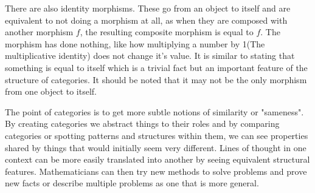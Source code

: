 \documentclass[10pt,a4paper]{amsart}
\begin{document}
\begin{flushleft}
There are also identity morphisms.
These go from an object to itself and are equivalent to not doing a morphism at all,
as when they are composed with another morphism $f$, the resulting composite morphism is equal to $f$.
The morphism has done nothing, like how multiplying a number by 1(The multiplicative identity) does not change it's value.
It is similar to stating that something is equal to itself which is a trivial fact but an important feature of the structure of categories.
It should be noted that it may not be the only morphism from one object to itself.

The point of categories is to get more subtle notions of similarity or "sameness".
By creating categories we abstract things to their roles and by comparing categories or spotting patterns and structures within them,
we can see properties shared by things that would initially seem very different.
Lines of thought in one context can be more easily translated into another by seeing equivalent structural features.
Mathematicians can then try new methods to solve problems and prove new facts or describe multiple problems as one that is more general.
\end{flushleft}
\end{document}
